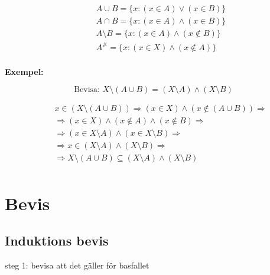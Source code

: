 \begin{align*}
  &\quad A \cup B = \{ x:(x \in A) \lor (x \in B)\} \\
  &\quad A \cap B = \{ x:(x \in A) \land (x \in B)\} \\
  &\quad A \setminus B = \{ x:(x \in A) \land (x \notin B)\} \\
  &\quad A^{\text{\#}} = \{ x:(x \in X) \land (x \notin A)\} \\
\end{align*}

\textbf{Exempel:}\par
\begin{equation}
  \text{Bevisa: } X \setminus (A \cup B) = (X \setminus A) \land (X \setminus B) 
\end{equation}

\begin{align*}
  &\quad x \in (X \setminus (A \cup B)) \Rightarrow (x \in X) \land (x \notin (A \cup B)) \Rightarrow \\
  &\quad \Rightarrow (x \in X) \land (x \notin A) \land (x \notin B) \Rightarrow \\
  &\quad \Rightarrow (x \in X \setminus A) \land (x \in X \setminus B) \Rightarrow \\
  &\quad \Rightarrow x \in (X \setminus A) \land (X \setminus B) \Rightarrow \\
  &\quad \Rightarrow X \setminus (A \cup B) \subseteq (X \setminus A) \land (X \setminus B) \\
\end{align*}


\newpage

\section{Bevis}
\subsection{Induktions bevis}
steg 1: bevisa att det gäller för basfallet

